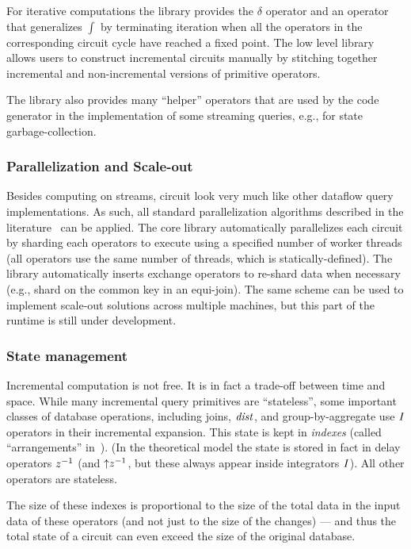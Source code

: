 For iterative computations the library provides the $\delta$ operator
and an operator that generalizes $\int$ by terminating iteration when
all the operators in the corresponding circuit cycle have reached a
fixed point.  The low level library allows users to construct
incremental circuits manually by stitching together incremental and
non-incremental versions of primitive operators.

The library also provides many ``helper'' operators that are used by
the code generator in the implementation of some streaming queries,
e.g., for state garbage-collection.

\subsubsection{Parallelization and Scale-out}

Besides computing on streams, \dbsp circuit look very much like other
dataflow query implementations.  As such, all standard parallelization
algorithms described in the literature~\cite{Graefe-sigmod90} can be
applied.  The core library automatically parallelizes each circuit by
sharding each operators to execute using a specified number of worker
threads (all operators use the same number of threads, which is
statically-defined).  The library automatically inserts exchange
operators to re-shard data when necessary (e.g., shard on the common
key in an equi-join).  The same scheme can be used to implement
scale-out solutions across multiple machines, but this part of the
runtime is still under development.

\subsubsection{State management}

Incremental computation is not free.  It is in fact a trade-off
between time and space.  While many incremental query primitives are
``stateless'', some important classes of database operations,
including joins, $\mathit{dist}$, and group-by-aggregate use $\mathit{I}$
operators in their incremental expansion.  This state is kept in
\emph{indexes} (called ``arrangements'' in~\cite{mcsherry-vldb20}).
(In the \dbsp theoretical model the state is stored in fact in delay
operators $z^{-1}$ (and ${\uparrow}z^{-1}$, but these always appear inside
integrators $\mathit{I}$).  All other operators are stateless.

The size of these indexes is proportional to the size of the total
data in the input data of these operators (and not just to the size of
the changes) --- and thus the total state of a circuit can even exceed
the size of the original database.

